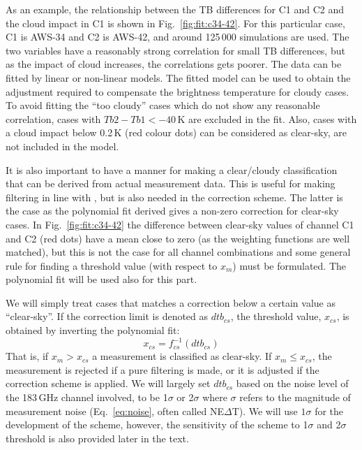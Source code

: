 \documentclass[12pt]{article}
\begin{document}
As an example, the relationship between the TB differences for C1 and C2 and
the cloud impact in C1 is shown in Fig.~\ref{fig:fit:c34-42}. For this
particular case, C1 is AWS-34 and C2 is AWS-42, and around 125\,000 simulations
are used. The two variables have a reasonably strong correlation for small TB
differences, but as the impact of cloud increases, the correlations gets
poorer. The data can be fitted by linear or non-linear models. The fitted model
can be used to obtain the adjustment required to compensate the brightness
temperature for cloudy cases. To avoid fitting the ``too cloudy'' cases which
do not show any reasonable correlation, cases with $Tb2-Tb1< -40$\,K are
excluded in the fit. Also, cases with a cloud impact below 0.2\,K (red colour
dots) can be considered as clear-sky, are not included in the model.

It is also important to have a manner for making a clear/cloudy classification
that can be derived from actual measurement data. This is useful for making
filtering in line with \citet{rekha2012potential}, but is also needed in the
correction scheme. The latter is the case as the polynomial fit derived gives a
non-zero correction for clear-sky cases. In Fig.~\ref{fig:fit:c34-42} the
difference between clear-sky values of channel C1 and C2 (red dots) have a mean
close to zero (as the weighting functions are well matched), but this is not
the case for all channel combinations and some general rule for finding a
threshold value (with respect to $x_m$) must be formulated. The polynomial fit
will be used also for this part.

We will simply treat cases that matches a correction below a certain value as
``clear-sky''. If the correction limit is denoted as $dtb_{cs}$, the threshold
value, $x_{cs}$, is obtained by inverting the polynomial fit:
\begin{equation}
x_{cs} = f_{cs}^{-1}(dtb_{cs}) 
\label{eq:dtb}
\end{equation}
That is, if $x_m>x_{cs}$ a measurement is classified as clear-sky. If
$x_m\leq x_{cs}$, the measurement is rejected if a pure filtering is made, or
it is adjusted if the correction scheme is applied. We will largely set
$dtb_{cs}$ based on the noise level of the 183\,GHz channel involved, to be
1$\sigma$ or 2$\sigma$ where $\sigma$ refers to the magnitude of measurement
noise (Eq.~\ref{eq:noise}, often called NE$\Delta$T). We will use $1\sigma$ for the development of the scheme, however, the sensitivity of the scheme to 1$\sigma$ and 2$\sigma$  threshold is also provided later in the text. 
\end{document}
